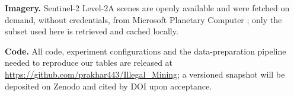\documentclass[review]{elsarticle}
\begin{document}
\noindent\textbf{Imagery.} Sentinel-2 Level-2A scenes are openly available and were fetched
on demand, without credentials, from Microsoft Planetary Computer \citep{planetarycomputer};
only the subset used here is retrieved and cached locally.

\noindent\textbf{Code.} All code, experiment configurations and the data-preparation
pipeline needed to reproduce our tables are released at
\url{https://github.com/prakhar443/Illegal_Mining}; a versioned snapshot will be deposited on
Zenodo and cited by DOI upon acceptance.



\end{document}
